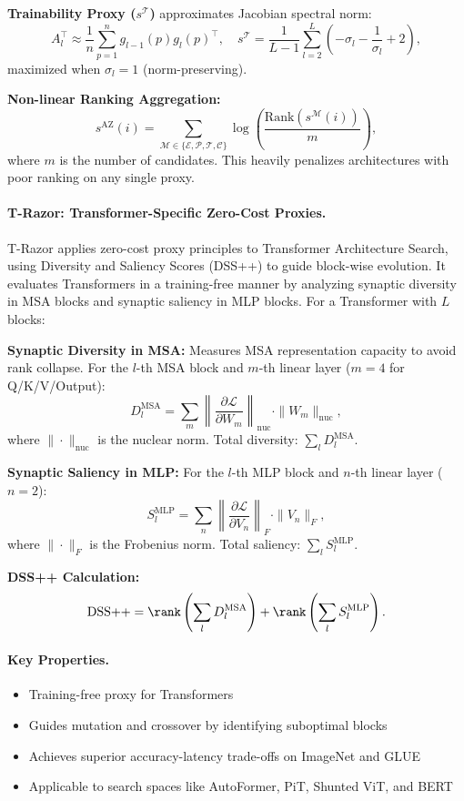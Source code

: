\textbf{Trainability Proxy ($s^{\mathcal{T}}$)} approximates Jacobian spectral norm:
\begin{equation}
	A_l^\top \approx \frac{1}{n}\sum_{p=1}^n g_{l-1}(p)g_l(p)^\top, \quad
	s^{\mathcal{T}}=\frac{1}{L-1}\sum_{l=2}^L \left(-\sigma_l - \frac{1}{\sigma_l} + 2\right),
\end{equation}
maximized when $\sigma_l=1$ (norm-preserving).

\textbf{Non-linear Ranking Aggregation:}
\begin{equation}
	s^{\text{AZ}}(i) = \sum_{\mathcal{M}\in\{\mathcal{E},\mathcal{P},\mathcal{T},\mathcal{C}\}} \log\left(\frac{\text{Rank}(s^{\mathcal{M}}(i))}{m}\right),
\end{equation}
where $m$ is the number of candidates. This heavily penalizes architectures with poor ranking on any single proxy.

\paragraph{T-Razor: Transformer-Specific Zero-Cost Proxies.}
T-Razor applies zero-cost proxy principles to Transformer Architecture Search, using Diversity and Saliency Scores (DSS++) to guide block-wise evolution. It evaluates Transformers in a training-free manner by analyzing synaptic diversity in MSA blocks and synaptic saliency in MLP blocks. For a Transformer with $L$ blocks:

\textbf{Synaptic Diversity in MSA:} Measures MSA representation capacity to avoid rank collapse. For the $l$-th MSA block and $m$-th linear layer ($m=4$ for Q/K/V/Output):
\[
D_l^{\text{MSA}} = \sum_m \left\| \frac{\partial \mathcal{L}}{\partial W_m} \right\|_{\text{nuc}} \cdot \| W_m \|_{\text{nuc}},
\]
where $\|\cdot\|_{\text{nuc}}$ is the nuclear norm. Total diversity: $\sum_l D_l^{\text{MSA}}$.

\textbf{Synaptic Saliency in MLP:} For the $l$-th MLP block and $n$-th linear layer ($n=2$):
\[
S_l^{\text{MLP}} = \sum_n \left\| \frac{\partial \mathcal{L}}{\partial V_n} \right\|_F \cdot \| V_n \|_F,
\]
where $\|\cdot\|_F$ is the Frobenius norm. Total saliency: $\sum_l S_l^{\text{MLP}}$.

\textbf{DSS++ Calculation:}
\[
\text{DSS++} = \rank\left( \sum_l D_l^{\text{MSA}} \right) + \rank\left( \sum_l S_l^{\text{MLP}} \right).
\]

\paragraph{Key Properties.}
\begin{itemize}[nosep]
	\item Training-free proxy for Transformers
	\item Guides mutation and crossover by identifying suboptimal blocks
	\item Achieves superior accuracy-latency trade-offs on ImageNet and GLUE
	\item Applicable to search spaces like AutoFormer, PiT, Shunted ViT, and BERT
\end{itemize}

